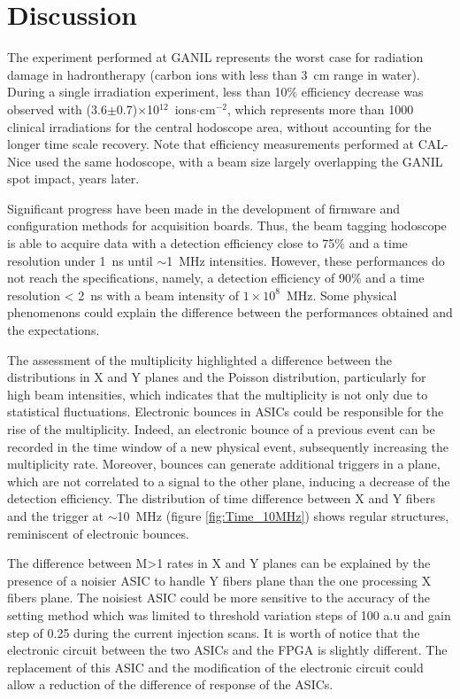 \documentclass[a4paper,11pt]{article}
\begin{document}
\section{Discussion}

The experiment performed at GANIL represents the worst case for radiation damage in hadrontherapy (carbon ions with less than 3~cm range in water). During a single irradiation experiment, less than 10\% efficiency decrease was observed with (3.6$\pm$0.7)$\times$10$^{12}$~ions$\cdot$cm$^{-2}$, which represents more than 1000 clinical irradiations for the central hodoscope area, without accounting for the longer time scale recovery. Note that efficiency measurements performed at CAL-Nice used the same hodoscope, with a beam size largely overlapping the GANIL spot impact, years later.

Significant progress have been made in the development of firmware and configuration methods for acquisition boards. Thus, the beam tagging hodoscope is able to acquire data with a detection efficiency close to 75\% and a time resolution under 1~ns until $\sim$1~MHz intensities. However, these performances do not reach the specifications, namely, a detection efficiency of 90\% and a time resolution < 2~ns with a  beam intensity of $1\times 10^{8}$~MHz. Some physical phenomenons could explain the difference between the performances obtained and the expectations.

The assessment of the multiplicity highlighted a difference between the distributions in X and Y planes and the Poisson distribution, particularly for high beam intensities, which indicates that the multiplicity is not only due to statistical fluctuations. Electronic bounces in ASICs could be responsible for the rise of the multiplicity. Indeed, an electronic bounce of a previous event can be recorded in the time window of a new physical event, subsequently increasing the multiplicity rate. Moreover, bounces can generate additional triggers in a plane, which are not correlated to a signal to the other plane, inducing a decrease of the detection efficiency. The distribution of time difference between X and Y fibers and the trigger at $\sim$10~MHz (figure \ref{fig:Time_10MHz}) shows regular structures, reminiscent of electronic bounces.

The difference between M>1 rates in X and Y planes can be explained by the presence of a noisier ASIC to handle Y fibers plane than the one processing X fibers plane. The noisiest ASIC could be more sensitive to the accuracy of the setting method which was limited to threshold variation steps of 100 a.u and gain step of 0.25 during the current injection scans. It is worth of notice that the electronic circuit between the two ASICs and the FPGA is slightly different. The replacement of this ASIC and the modification of the electronic circuit could allow a reduction of the difference of response of the ASICs.
\end{document}
